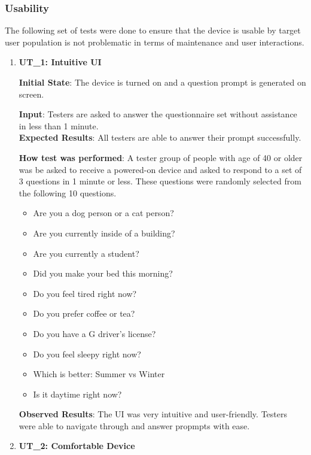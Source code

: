 \documentclass[12pt, titlepage]{article}
\begin{document}
\subsubsection{Usability}
The following set of tests were done to ensure that the device is usable by target user population is not problematic in terms of maintenance and user interactions.
\begin{enumerate}

  \item\textbf{{UT\_1: Intuitive UI\\}}\label{UT1}

  \textbf{Initial State}: The device is turned on and a question prompt is generated on screen.

  \textbf{Input}: Testers are asked to answer the questionnaire set without assistance in less than 1 minute.\\
  \textbf{Expected Results}: All testers are able to answer their prompt successfully.

  \textbf{How test was performed}: A tester group of people with age of 40 or older was be asked to receive a powered-on device and asked to respond to a set of 3 questions in 1 minute or less. These questions were randomly selected from the following 10 questions.

  \begin{itemize}
    \item Are you a dog person or a cat person?
    \item Are you currently inside of a building?
    \item Are you currently a student?
    \item Did you make your bed this morning?
    \item Do you feel tired right now?
    \item Do you prefer coffee or tea?
    \item Do you have a G driver's license?
    \item Do you feel sleepy right now?
    \item Which is better: Summer vs Winter
    \item Is it daytime right now?
  \end{itemize}

  \textbf{Observed Results}: The UI was very intuitive and user-friendly. Testers were able to navigate through and answer propmpts with ease.

  \item\textbf{{UT\_2: Comfortable Device\\}}\label{UT2}


\end{enumerate}
\end{document}
